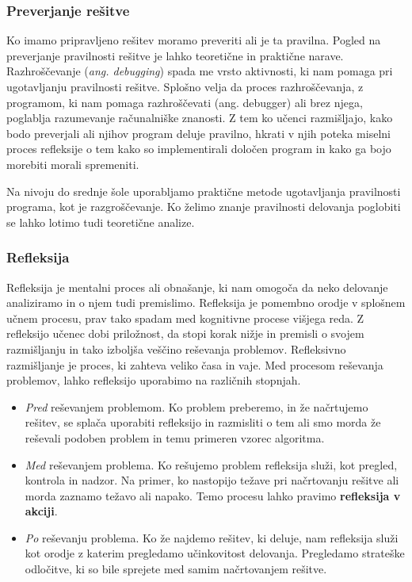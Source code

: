 \subsubsection{Preverjanje rešitve}
\label{sec:preverjanje_rešitve}
Ko imamo pripravljeno rešitev moramo preveriti ali je ta
pravilna. Pogled na preverjanje pravilnosti rešitve je lahko
teoretične in praktične narave. Razhroščevanje (\emph{ang. debugging})
spada me vrsto aktivnosti, ki nam pomaga pri ugotavljanju pravilnosti
rešitve. Splošno velja da proces razhroščevanja, z programom, ki nam
pomaga razhroščevati (ang. debugger) ali brez njega, poglablja
razumevanje računalniške znanosti. Z tem ko učenci razmišljajo, kako
bodo preverjali ali njihov program deluje pravilno, hkrati v njih
poteka miselni proces refleksije o tem kako so implementirali določen
program in kako ga bojo morebiti morali spremeniti.

Na nivoju do srednje šole uporabljamo praktične metode ugotavljanja
pravilnosti programa, kot je razgroščevanje. Ko želimo znanje
pravilnosti delovanja poglobiti se lahko lotimo tudi teoretične
analize.

\subsubsection{Refleksija}
\label{sec:refleksije}

Refleksija je mentalni proces ali obnašanje, ki nam omogoča da neko
delovanje analiziramo in o njem tudi premislimo. Refleksija je
pomembno orodje v splošnem učnem procesu, prav tako spadam med
kognitivne procese višjega reda. Z refleksijo učenec dobi priložnost,
da stopi korak nižje in premisli o svojem razmišljanju in tako
izboljša veščino reševanja problemov. Refleksivno razmišljanje je
proces, ki zahteva veliko časa in vaje. Med procesom reševanja
problemov, lahko refleksijo uporabimo na različnih stopnjah.

\begin{itemize}
\tightlist
\item \emph{Pred} reševanjem problemom. Ko problem preberemo, in že
  načrtujemo rešitev, se splača uporabiti refleksijo in razmisliti o
  tem ali smo morda že reševali podoben problem in temu primeren
  vzorec algoritma.
\item \emph{Med} reševanjem problema. Ko rešujemo problem refleksija
  služi, kot pregled, kontrola in nadzor. Na primer, ko nastopijo
  težave pri načrtovanju rešitve ali morda zaznamo težavo ali
  napako. Temo procesu lahko pravimo \textbf{refleksija v akciji}.
\item \emph{Po} reševanju problema. Ko že najdemo rešitev, ki deluje,
  nam refleksija služi kot orodje z katerim pregledamo učinkovitost
  delovanja. Pregledamo strateške odločitve, ki so bile sprejete med
  samim načrtovanjem rešitve.
\end{itemize}

